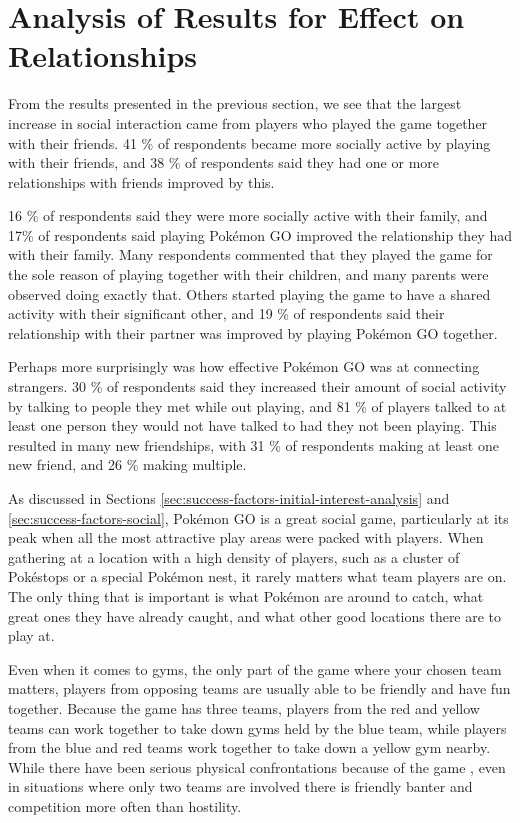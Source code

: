 \section{Analysis of Results for Effect on Relationships}
\label{sec:mental-health-relationships}

From the results presented in the previous section, we see that the largest increase in social interaction came from players who played the game together with their friends. 41 \% of respondents became more socially active by playing with their friends, and 38 \% of respondents said they had one or more relationships with friends improved by this.

16 \% of respondents said they were more socially active with their family, and 17\% of respondents said playing Pokémon GO improved the relationship they had with their family. Many respondents commented that they played the game for the sole reason of playing together with their children, and many parents were observed doing exactly that. Others started playing the game to have a shared activity with their significant other, and 19 \% of respondents said their relationship with their partner was improved by playing Pokémon GO together.

Perhaps more surprisingly was how effective Pokémon GO was at connecting strangers. 30 \% of respondents said they increased their amount of social activity by talking to people they met while out playing, and 81 \% of players talked to at least one person they would not have talked to had they not been playing. This resulted in many new friendships, with 31 \% of respondents making at least one new friend, and 26 \% making multiple.

As discussed in Sections \ref{sec:success-factors-initial-interest-analysis} and \ref{sec:success-factors-social}, Pokémon GO is a great social game, particularly at its peak when all the most attractive play areas were packed with players. When gathering at a location with a high density of players, such as a cluster of Pokéstops or a special Pokémon nest, it rarely matters what team players are on. The only thing that is important is what Pokémon are around to catch, what great ones they have already caught, and what other good locations there are to play at.

Even when it comes to gyms, the only part of the game where your chosen team matters, players from opposing teams are usually able to be friendly and have fun together. Because the game has three teams, players from the red and yellow teams can work together to take down gyms held by the blue team, while players from the blue and red teams work together to take down a yellow gym nearby. While there have been serious physical confrontations because of the game \cite{nrkBeatUp}\cite{side2wrongTeam}, even in situations where only two teams are involved there is friendly banter and competition more often than hostility. 


